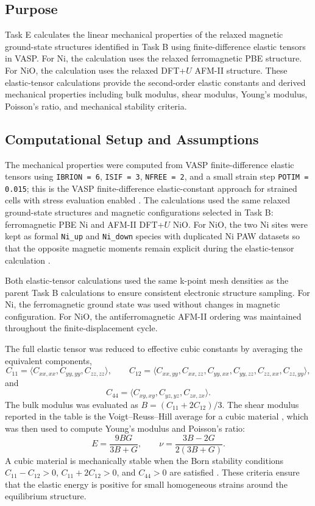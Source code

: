 \subsection{Purpose}

Task E calculates the linear mechanical properties of the relaxed magnetic
ground-state structures identified in Task B using finite-difference elastic
tensors in VASP.  For Ni, the calculation uses the relaxed ferromagnetic PBE
structure.  For NiO, the calculation uses the relaxed DFT+\(U\) AFM-II
structure.  These elastic-tensor calculations provide the second-order elastic
constants and derived mechanical properties including bulk modulus, shear
modulus, Young's modulus, Poisson's ratio, and mechanical stability criteria.

\subsection{Computational Setup and Assumptions}

The mechanical properties were computed from VASP finite-difference elastic
tensors using \texttt{IBRION = 6}, \texttt{ISIF = 3}, \texttt{NFREE = 2}, and a
small strain step \texttt{POTIM = 0.015}; this is the VASP finite-difference
elastic-constant approach for strained cells with stress evaluation enabled
\cite{vasp-ibrion,vasp-isif}.  The calculations used the same relaxed
ground-state structures and magnetic configurations selected in Task B:
ferromagnetic PBE Ni and AFM-II DFT+\(U\) NiO.  For NiO, the two Ni sites were
kept as formal \texttt{Ni\_up} and \texttt{Ni\_down} species with duplicated Ni
PAW datasets so that the opposite magnetic moments remain explicit during the
elastic-tensor calculation \cite{vasp-nio-u}.

Both elastic-tensor calculations used the same k-point mesh densities as the
parent Task B calculations to ensure consistent electronic structure sampling.
For Ni, the ferromagnetic ground state was used without changes in magnetic
configuration.  For NiO, the antiferromagnetic AFM-II ordering was maintained
throughout the finite-displacement cycle.

The full elastic tensor was reduced to effective cubic constants by averaging
the equivalent components,
\[
C_{11} = \langle C_{xx,xx}, C_{yy,yy}, C_{zz,zz}\rangle,\qquad
C_{12} = \langle C_{xx,yy}, C_{xx,zz}, C_{yy,xx}, C_{yy,zz}, C_{zz,xx},
C_{zz,yy}\rangle,
\]
and
\[
C_{44} = \langle C_{xy,xy}, C_{yz,yz}, C_{zx,zx}\rangle.
\]
The bulk modulus was evaluated as \(B=(C_{11}+2C_{12})/3\).  The shear modulus
reported in the table is the Voigt--Reuss--Hill average for a cubic material
\cite{voigt,reuss,hill}, which was then used to compute Young's modulus and
Poisson's ratio:
\[
E = \frac{9BG}{3B+G},\qquad
\nu = \frac{3B-2G}{2(3B+G)}.
\]
A cubic material is mechanically stable when the Born stability conditions
\(C_{11}-C_{12}>0\), \(C_{11}+2C_{12}>0\), and \(C_{44}>0\) are satisfied
\cite{born-huang,mouhat-coudert}.  These criteria ensure that the elastic
energy is positive for small homogeneous strains around the equilibrium
structure.

